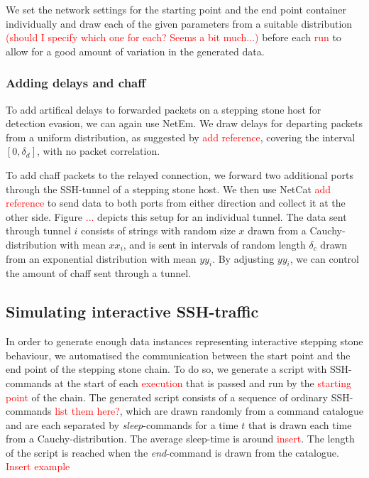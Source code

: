 \documentclass[conference]{IEEEtran}\usepackage[]{graphicx}\usepackage[]{color}
\begin{document}
We set the network settings for the starting point and the end point container individually and draw each of the given parameters from a suitable distribution \textcolor{red}{(should I specify which one for each? Seems a bit much...)} before each \textcolor{red}{run} to allow for a good amount of variation in the generated data.








\subsubsection{Adding delays and chaff}

To add artifical delays to forwarded packets on a stepping stone host for detection evasion, we can again use NetEm. We draw delays for departing packets from a uniform distribution, as suggested by \textcolor{red}{add reference}, covering the interval $[0,\delta_d]$, with no packet correlation. 

To add chaff packets to the relayed connection, we forward two additional ports through the SSH-tunnel of a stepping stone host. We then use NetCat \textcolor{red}{add reference} to send data to both ports from either direction and collect it at the other side. Figure \textcolor{red}{...} depicts this setup for an individual tunnel. 
The data sent through tunnel $i$ consists of strings with random size $x$ drawn from a Cauchy-distribution with mean $xx_i$, and is sent in intervals of random length $\delta_c$ drawn from an exponential distribution with mean $yy_i$. By adjusting $yy_i$, we can control the amount of chaff sent through a tunnel. 

\subsection{Simulating interactive SSH-traffic}

In order to generate enough data instances representing interactive stepping stone behaviour, we automatised the communication between the start point and the end point of the stepping stone chain. To do so, we generate a script with SSH-commands at the start of each \textcolor{red}{execution} that is passed and run by the \textcolor{red}{starting point} of the chain. The generated script consists of a sequence of ordinary SSH-commands \textcolor{red}{list them here?}, which are drawn randomly from a command catalogue and are each separated by \textit{sleep}-commands for a time $t$ that is drawn each time from a Cauchy-distribution. The average sleep-time is around \textcolor{red}{insert}. The length of the script is reached when the \textit{end}-command is drawn from the catalogue.
\textcolor{red}{Insert example}
\end{document}
